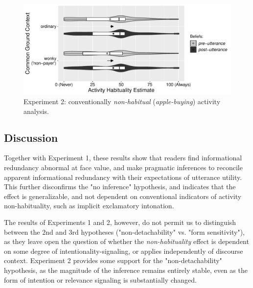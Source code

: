 \documentclass{sp}\usepackage[]{graphicx}\usepackage[]{color}
\makeatletter
\def\maxwidth{ %
  \ifdim\Gin@nat@width>\linewidth
    \linewidth
  \else
    \Gin@nat@width
  \fi
}
\newenvironment{knitrout}{}{} %
\makeatother
\begin{document}
\begin{knitrout}
\color{fgcolor}\begin{figure}
\includegraphics[width=\maxwidth]{figure/unnamed-chunk-41-1} \caption{\label{fig:exp2nonhabitual}Experiment 2: conventionally \textit{non-habitual} (\textit{apple-buying}) activity analysis.}\label{fig:unnamed-chunk-41}
\end{figure}


\end{knitrout}

\subsection{Discussion}

Together with Experiment 1, these results show that readers find informational redundancy abnormal at face value, and make pragmatic inferences to reconcile apparent informational redundancy with their expectations of utterance utility. This further disconfirms the "no inference" hypothesis, and indicates that the effect is generalizable, and not dependent on conventional indicators of activity non-habituality, such as implicit exclamatory intonation.

The results of Experiments 1 and 2, however, do not permit us to distinguish between the 2nd and 3rd hypotheses ("non-detachability" vs. "form sensitivity"), as they leave open the question of whether the \textit{non-habituality} effect is dependent on some degree of intentionality-signaling, or applies independently of discourse context. Experiment 2 provides some support for the "non-detachability" hypothesis, as the magnitude of the inference remains entirely stable, even as the form of intention or relevance signaling is substantially changed.
\end{document}
